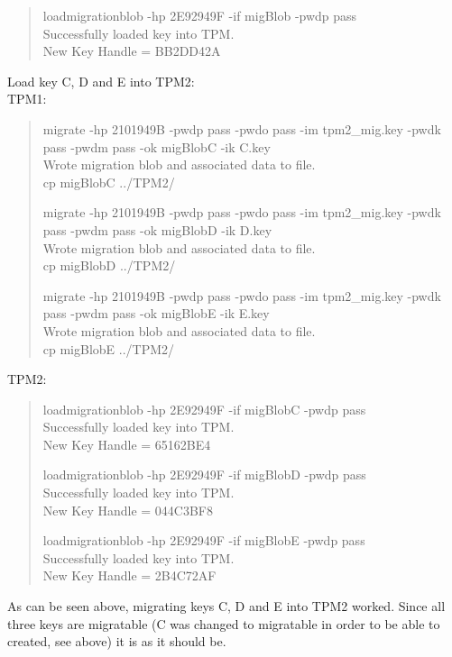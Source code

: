 \documentclass[10pt]{article}
\begin{document}
\begin{quote}
loadmigrationblob -hp 2E92949F -if migBlob -pwdp pass \\
Successfully loaded key into TPM.\\
New Key Handle = BB2DD42A\\
\end{quote}

Load key C, D and E into TPM2:\\
TPM1:
\begin{quote}
migrate -hp 2101949B -pwdp pass -pwdo pass -im tpm2\_mig.key -pwdk pass -pwdm pass -ok migBlobC -ik C.key\\
Wrote migration blob and associated data to file.\\
cp migBlobC ../TPM2/

migrate -hp 2101949B -pwdp pass -pwdo pass -im tpm2\_mig.key -pwdk pass -pwdm pass -ok migBlobD -ik D.key\\
Wrote migration blob and associated data to file.\\
cp migBlobD ../TPM2/

migrate -hp 2101949B -pwdp pass -pwdo pass -im tpm2\_mig.key -pwdk pass -pwdm pass -ok migBlobE -ik E.key\\
Wrote migration blob and associated data to file.\\
cp migBlobE ../TPM2/

\end{quote}
TPM2:
\begin{quote}
loadmigrationblob -hp 2E92949F -if migBlobC -pwdp pass \\
Successfully loaded key into TPM.\\
New Key Handle = 65162BE4

loadmigrationblob -hp 2E92949F -if migBlobD -pwdp pass \\
Successfully loaded key into TPM.\\
New Key Handle = 044C3BF8

loadmigrationblob -hp 2E92949F -if migBlobE -pwdp pass \\
Successfully loaded key into TPM.\\
New Key Handle = 2B4C72AF
\end{quote}

As can be seen above, migrating keys C, D and E into TPM2 worked.
Since all three keys are migratable (C was changed to migratable
in order to be able to created, see above) it is as it should be.
\end{document}
